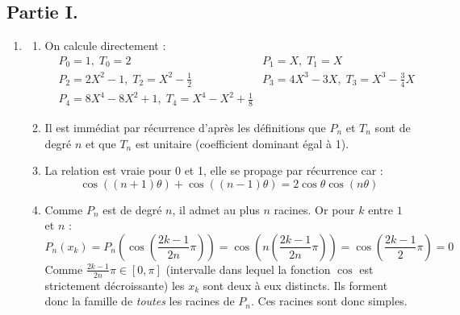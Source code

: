 \subsection*{Partie I.}
\begin{enumerate}
 \item \begin{enumerate}
 \item On calcule directement :
\begin{align*}
 &P_0 = 1,\;           T_0= 2 
 &P_1 = X,\;           T_1= X \\
 &P_2 = 2X^2-1,\;      T_2 = X^2 -\frac{1}{2} 
 &P_3 = 4X^3-3X ,\;    T_3 = X^3 -\frac{3}{4}X\\
 &P_4 = 8X^4-8X^2+1,\; T_4 = X^4 -X^2 +\frac{1}{8}
\end{align*}
\item Il est immédiat par récurrence d'après les définitions que $P_n$ et $T_n$ sont de degré $n$ et que $T_n$ est unitaire (coefficient dominant égal à 1).
\item La relation est vraie pour 0 et 1, elle se propage par récurrence car : 
\begin{displaymath}
 \cos ((n+1)\theta) + \cos ((n-1)\theta)= 2\cos \theta \cos (n\theta)
\end{displaymath}
\item Comme $P_n$ est de degré $n$, il admet au plus $n$ racines. Or pour $k$ entre $1$ et $n$ :
\begin{displaymath}
 P_n(x_k)= P_n\left( \cos(\frac{2k-1}{2n}\pi)\right)=\cos\left( n (\frac{2k-1}{2n}\pi)\right) = \cos\left( \frac{2k-1}{2}\pi\right) = 0 
\end{displaymath}
Comme $\frac{2k-1}{2n}\pi \in [0,\pi]$ (intervalle dans lequel la fonction $\cos$ est strictement décroissante) les $x_k$ sont deux à eux distincts. Ils forment donc la famille de \emph{toutes} les racines de $P_n$. Ces racines sont donc simples.


\end{enumerate}
\end{enumerate}
